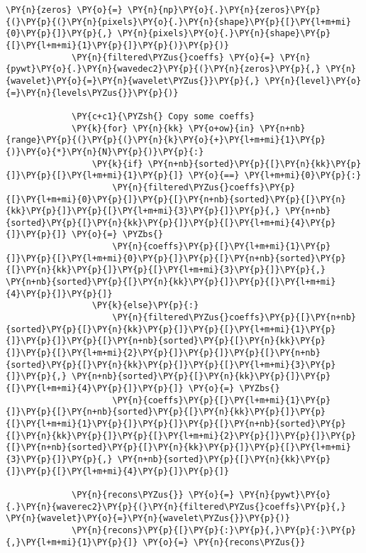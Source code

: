 \begin{Verbatim}[commandchars=\\\{\}]
             \PY{n}{zeros} \PY{o}{=} \PY{n}{np}\PY{o}{.}\PY{n}{zeros}\PY{p}{(}\PY{p}{(}\PY{n}{pixels}\PY{o}{.}\PY{n}{shape}\PY{p}{[}\PY{l+m+mi}{0}\PY{p}{]}\PY{p}{,} \PY{n}{pixels}\PY{o}{.}\PY{n}{shape}\PY{p}{[}\PY{l+m+mi}{1}\PY{p}{]}\PY{p}{)}\PY{p}{)}
             \PY{n}{filtered\PYZus{}coeffs} \PY{o}{=} \PY{n}{pywt}\PY{o}{.}\PY{n}{wavedec2}\PY{p}{(}\PY{n}{zeros}\PY{p}{,} \PY{n}{wavelet}\PY{o}{=}\PY{n}{wavelet\PYZus{}}\PY{p}{,} \PY{n}{level}\PY{o}{=}\PY{n}{levels\PYZus{}}\PY{p}{)}
         
             \PY{c+c1}{\PYZsh{} Copy some coeffs}
             \PY{k}{for} \PY{n}{kk} \PY{o+ow}{in} \PY{n+nb}{range}\PY{p}{(}\PY{p}{(}\PY{n}{k}\PY{o}{+}\PY{l+m+mi}{1}\PY{p}{)}\PY{o}{*}\PY{n}{N}\PY{p}{)}\PY{p}{:}
                 \PY{k}{if} \PY{n+nb}{sorted}\PY{p}{[}\PY{n}{kk}\PY{p}{]}\PY{p}{[}\PY{l+m+mi}{1}\PY{p}{]} \PY{o}{==} \PY{l+m+mi}{0}\PY{p}{:}
                     \PY{n}{filtered\PYZus{}coeffs}\PY{p}{[}\PY{l+m+mi}{0}\PY{p}{]}\PY{p}{[}\PY{n+nb}{sorted}\PY{p}{[}\PY{n}{kk}\PY{p}{]}\PY{p}{[}\PY{l+m+mi}{3}\PY{p}{]}\PY{p}{,} \PY{n+nb}{sorted}\PY{p}{[}\PY{n}{kk}\PY{p}{]}\PY{p}{[}\PY{l+m+mi}{4}\PY{p}{]}\PY{p}{]} \PY{o}{=} \PYZbs{}
                     \PY{n}{coeffs}\PY{p}{[}\PY{l+m+mi}{1}\PY{p}{]}\PY{p}{[}\PY{l+m+mi}{0}\PY{p}{]}\PY{p}{[}\PY{n+nb}{sorted}\PY{p}{[}\PY{n}{kk}\PY{p}{]}\PY{p}{[}\PY{l+m+mi}{3}\PY{p}{]}\PY{p}{,} \PY{n+nb}{sorted}\PY{p}{[}\PY{n}{kk}\PY{p}{]}\PY{p}{[}\PY{l+m+mi}{4}\PY{p}{]}\PY{p}{]}
                 \PY{k}{else}\PY{p}{:}
                     \PY{n}{filtered\PYZus{}coeffs}\PY{p}{[}\PY{n+nb}{sorted}\PY{p}{[}\PY{n}{kk}\PY{p}{]}\PY{p}{[}\PY{l+m+mi}{1}\PY{p}{]}\PY{p}{]}\PY{p}{[}\PY{n+nb}{sorted}\PY{p}{[}\PY{n}{kk}\PY{p}{]}\PY{p}{[}\PY{l+m+mi}{2}\PY{p}{]}\PY{p}{]}\PY{p}{[}\PY{n+nb}{sorted}\PY{p}{[}\PY{n}{kk}\PY{p}{]}\PY{p}{[}\PY{l+m+mi}{3}\PY{p}{]}\PY{p}{,} \PY{n+nb}{sorted}\PY{p}{[}\PY{n}{kk}\PY{p}{]}\PY{p}{[}\PY{l+m+mi}{4}\PY{p}{]}\PY{p}{]} \PY{o}{=} \PYZbs{}
                     \PY{n}{coeffs}\PY{p}{[}\PY{l+m+mi}{1}\PY{p}{]}\PY{p}{[}\PY{n+nb}{sorted}\PY{p}{[}\PY{n}{kk}\PY{p}{]}\PY{p}{[}\PY{l+m+mi}{1}\PY{p}{]}\PY{p}{]}\PY{p}{[}\PY{n+nb}{sorted}\PY{p}{[}\PY{n}{kk}\PY{p}{]}\PY{p}{[}\PY{l+m+mi}{2}\PY{p}{]}\PY{p}{]}\PY{p}{[}\PY{n+nb}{sorted}\PY{p}{[}\PY{n}{kk}\PY{p}{]}\PY{p}{[}\PY{l+m+mi}{3}\PY{p}{]}\PY{p}{,} \PY{n+nb}{sorted}\PY{p}{[}\PY{n}{kk}\PY{p}{]}\PY{p}{[}\PY{l+m+mi}{4}\PY{p}{]}\PY{p}{]}
                 
             \PY{n}{recons\PYZus{}} \PY{o}{=} \PY{n}{pywt}\PY{o}{.}\PY{n}{waverec2}\PY{p}{(}\PY{n}{filtered\PYZus{}coeffs}\PY{p}{,} \PY{n}{wavelet}\PY{o}{=}\PY{n}{wavelet\PYZus{}}\PY{p}{)}
             \PY{n}{recons}\PY{p}{[}\PY{p}{:}\PY{p}{,}\PY{p}{:}\PY{p}{,}\PY{l+m+mi}{1}\PY{p}{]} \PY{o}{=} \PY{n}{recons\PYZus{}}
             

\end{Verbatim}
